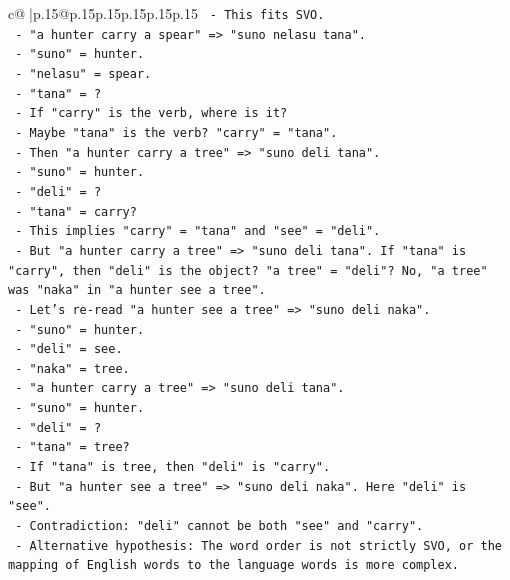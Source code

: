 \documentclass{article}
\begin{document}
{\begin{supertabular}{c@{$\;$}|p{.15\linewidth}@{}p{.15\linewidth}p{.15\linewidth}p{.15\linewidth}p{.15\linewidth}p{.15\linewidth}}
{{{\texttt{           {-} This fits SVO.} \\
\texttt{         {-} "a hunter carry a spear" => "suno nelasu tana".} \\
\texttt{           {-} "suno" = hunter.} \\
\texttt{           {-} "nelasu" = spear.} \\
\texttt{           {-} "tana" = ?} \\
\texttt{           {-} If "carry" is the verb, where is it?} \\
\texttt{           {-} Maybe "tana" is the verb? "carry" = "tana".} \\
\texttt{           {-} Then "a hunter carry a tree" => "suno deli tana".} \\
\texttt{             {-} "suno" = hunter.} \\
\texttt{             {-} "deli" = ?} \\
\texttt{             {-} "tana" = carry?} \\
\texttt{             {-} This implies "carry" = "tana" and "see" = "deli".} \\
\texttt{             {-} But "a hunter carry a tree" => "suno deli tana". If "tana" is "carry", then "deli" is the object? "a tree" = "deli"? No, "a tree" was "naka" in "a hunter see a tree".} \\
\texttt{             {-} Let's re{-}read "a hunter see a tree" => "suno deli naka".} \\
\texttt{               {-} "suno" = hunter.} \\
\texttt{               {-} "deli" = see.} \\
\texttt{               {-} "naka" = tree.} \\
\texttt{             {-} "a hunter carry a tree" => "suno deli tana".} \\
\texttt{               {-} "suno" = hunter.} \\
\texttt{               {-} "deli" = ?} \\
\texttt{               {-} "tana" = tree?} \\
\texttt{               {-} If "tana" is tree, then "deli" is "carry".} \\
\texttt{               {-} But "a hunter see a tree" => "suno deli naka". Here "deli" is "see".} \\
\texttt{               {-} Contradiction: "deli" cannot be both "see" and "carry".} \\
\texttt{     {-} Alternative hypothesis: The word order is not strictly SVO, or the mapping of English words to the language words is more complex.} \\
}}}
\end{supertabular}}
\end{document}
